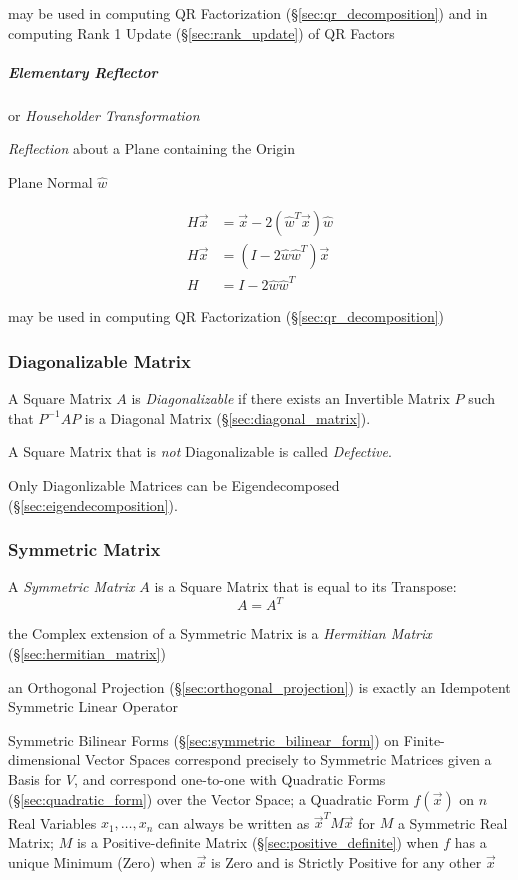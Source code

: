 \fist may be used in computing QR Factorization (\S\ref{sec:qr_decomposition})
and in computing Rank 1 Update (\S\ref{sec:rank_update}) of QR Factors



\subparagraph{Elementary Reflector}\label{sec:elementary_reflector}\hfill

or \emph{Householder Transformation}

\emph{Reflection} about a Plane containing the Origin

Plane Normal $\hat{w}$

\begin{align*}
  H\vec{x} & = \vec{x} - 2(\hat{w}^T\vec{x})\hat{w} \\
  H\vec{x} & = (I - 2\hat{w}\hat{w}^T)\vec{x}       \\
         H & = I - 2\hat{w}\hat{w}^T
\end{align*}

\fist may be used in computing QR Factorization (\S\ref{sec:qr_decomposition})



\subsubsection{Diagonalizable Matrix}\label{sec:diagonalizable_matrix}

A Square Matrix $A$ is \emph{Diagonalizable} if there exists an Invertible
Matrix $P$ such that $P^{-1}AP$ is a Diagonal Matrix
(\S\ref{sec:diagonal_matrix}).

A Square Matrix that is \emph{not} Diagonalizable is called \emph{Defective}.

Only Diagonlizable Matrices can be Eigendecomposed
(\S\ref{sec:eigendecomposition}).



\subsubsection{Symmetric Matrix}\label{sec:symmetric_matrix}

A \emph{Symmetric Matrix} $A$ is a Square Matrix that is equal to its
Transpose:
\[
  A = A^T
\]

the Complex extension of a Symmetric Matrix is a \emph{Hermitian Matrix}
(\S\ref{sec:hermitian_matrix})

an Orthogonal Projection (\S\ref{sec:orthogonal_projection}) is exactly an
Idempotent Symmetric Linear Operator

Symmetric Bilinear Forms (\S\ref{sec:symmetric_bilinear_form}) on
Finite-dimensional Vector Spaces correspond precisely to Symmetric Matrices
given a Basis for $V$, and correspond one-to-one with Quadratic Forms
(\S\ref{sec:quadratic_form}) over the Vector Space;
a Quadratic Form $f(\vec{x})$ on $n$ Real Variables $x_1,\ldots,x_n$ can always
be written as $\vec{x}^T M \vec{x}$ for $M$ a Symmetric Real Matrix; $M$ is a
Positive-definite Matrix (\S\ref{sec:positive_definite}) when $f$ has a unique
Minimum (Zero) when $\vec{x}$ is Zero and is Strictly Positive for any other
$\vec{x}$

